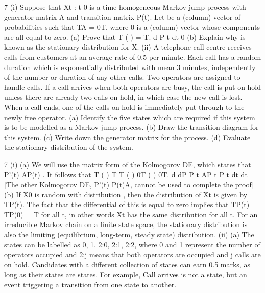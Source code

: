 \documentclass[a4paper,12pt]{article}
\begin{document}
\begin{enumerate}

7 (i) Suppose that {Xt : t 0} is a time-homogeneous Markov jump process with
generator matrix A and transition matrix P(t). Let be a (column) vector of
probabilities such that TA = 0T, where 0 is a (column) vector whose
components are all equal to zero.
(a) Prove that
T ( ) = T. d
P t
dt
0
(b) Explain why is known as the stationary distribution for X.
(ii) A telephone call centre receives calls from customers at an average rate of 0.5
per minute. Each call has a random duration which is exponentially distributed with mean 3 minutes, independently of the number or duration of
any other calls. Two operators are assigned to handle calls. If a call arrives when both operators are busy, the call is put on hold unless there are already
two calls on hold, in which case the new call is lost. When a call ends, one of the calls on hold is immediately put through to the newly free operator.
(a) Identify the five states which are required if this system is to be
modelled as a Markov jump process.
(b) Draw the transition diagram for this system.
(c) Write down the generator matrix for the process.
(d) Evaluate the stationary distribution of the system.

\newpage
7 (i) (a) We will use the matrix form of the Kolmogorov DE, which states that
P'(t) AP(t) .
It follows that T ( ) T T ( ) 0T ( ) 0T. d dP
P t AP t P t
dt dt
[The other Kolmogorov DE, P'(t) P(t)A, cannot be used to complete the proof]
(b) If X0 is random with distribution , then the distribution of Xt is given by TP(t).
The fact that the differential of this is equal to zero implies that TP(t)
= TP(0) = T for all t, in other words Xt has the same distribution for all t.
For an irreducible Markov chain on a finite state space, the stationary distribution is also the limiting (equilibrium, long-term, steady state)
distribution.
(ii) (a) The states can be labelled as 0, 1, 2:0, 2:1, 2:2, where 0 and 1 represent
the number of operators occupied and 2:j means that both operators are occupied and j calls are on hold.
Candidates with a different collection of states can earn 0.5 marks, as long as their states are states. For example, Call arrives is not a
state, but an event triggering a transition from one state to another.


\end{enumerate}
\end{document}
